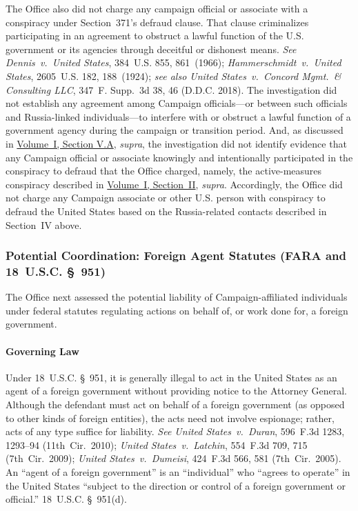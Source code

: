 The Office also did not charge any campaign official or associate with a conspiracy under Section~371's defraud clause.
That clause criminalizes participating in an agreement to obstruct a lawful function of the U.S. government or its agencies through deceitful or dishonest means.
\textit{See Dennis~v.\ United States}, 384~U.S. 855, 861~(1966); \textit{Hammerschmidt~v.\ United States}, 2605~U.S. 182, 188~(1924); \textit{see also United States~v.\ Concord Mgmt.\ \& Consulting LLC}, 347~F. Supp.~3d 38, 46 (D.D.C. 2018).
The investigation did not establish any agreement among Campaign officials---or between such officials and Russia-linked individuals---to interfere with or obstruct a lawful function of a government agency during the campaign or transition period.
And, as discussed in \hyperlink{subsection.1.5.1}{Volume~I, Section V.A}, \textit{supra}, the investigation did not identify evidence that any Campaign official or associate knowingly and intentionally participated in the conspiracy to defraud that the Office charged, namely, the active-measures conspiracy described in \hyperlink{section.1.2}{Volume~I, Section~II}, \textit{supra}.
Accordingly, the Office did not charge any Campaign associate or other U.S. person with conspiracy to defraud the United States based on the Russia-related contacts described in Section~IV above.

\subsubsection{Potential Coordination: Foreign Agent Statutes (FARA and 18~U.S.C. \S~951)}
The Office next assessed the potential liability of Campaign-affiliated individuals under federal statutes regulating actions on behalf of, or work done for, a foreign government.

\paragraph{Governing Law}
Under 18~U.S.C. \S~951, it is generally illegal to act in the United States as an agent of a foreign government without providing notice to the Attorney General.
Although the defendant must act on behalf of a foreign government (as opposed to other kinds of foreign entities), the acts need not involve espionage; rather, acts of any type suffice for liability.
\textit{See United States~v.\ Duran}, 596~F.3d 1283, 1293--94 (11th~Cir.~2010); \textit{United States~v.\ Latchin}, 554~F.3d 709, 715 (7th~Cir.~2009); \textit{United States~v.\ Dumeisi}, 424~F.3d 566, 581 (7th~Cir.~2005).
An ``agent of a foreign government'' is an ``individual'' who ``agrees to operate'' in the United States ``subject to the direction or control of a foreign government or official.'' 18~U.S.C. \S~951(d).

